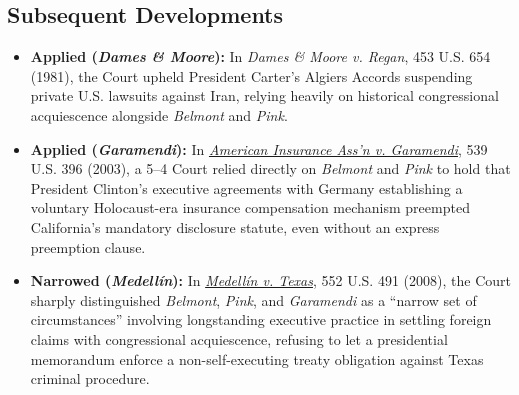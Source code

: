 \documentclass[12pt]{article}
\begin{document}
\subsection{Subsequent Developments}

\begin{itemize}

\item \textbf{Applied (\textit{Dames \& Moore}):} In \textit{Dames \& Moore v. Regan}, 453 U.S. 654 (1981), the Court upheld President Carter's Algiers Accords suspending private U.S. lawsuits against Iran, relying heavily on historical congressional acquiescence alongside \textit{Belmont} and \textit{Pink}.

\item \textbf{Applied (\textit{Garamendi}):} In \href{https://supreme.justia.com/cases/federal/us/539/396/}{\textit{American Insurance Ass'n v. Garamendi}}, 539 U.S. 396 (2003), a 5--4 Court relied directly on \textit{Belmont} and \textit{Pink} to hold that President Clinton's executive agreements with Germany establishing a voluntary Holocaust-era insurance compensation mechanism preempted California's mandatory disclosure statute, even without an express preemption clause.

\item \textbf{Narrowed (\textit{Medell\'in}):} In \href{https://supreme.justia.com/cases/federal/us/552/491/}{\textit{Medell\'in v. Texas}}, 552 U.S. 491 (2008), the Court sharply distinguished \textit{Belmont}, \textit{Pink}, and \textit{Garamendi} as a ``narrow set of circumstances'' involving longstanding executive practice in settling foreign claims with congressional acquiescence, refusing to let a presidential memorandum enforce a non-self-executing treaty obligation against Texas criminal procedure.

\end{itemize}
\end{document}
